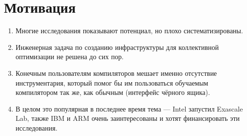 \section{Мотивация}
\begin{enumerate}
\item Многие исследования показывают потенциал, но плохо систематизированы.
\item Инженерная задача по созданию инфраструктуры для коллективной оптимизации не решена до сих пор.
\item Конечным пользователям компиляторов мешает именно отсутствие инструментария, который помог бы им пользоваться обучаемым компилятором так же, как обычным (интерфейс чёрного ящика).
\item В целом это популярная в последнее время тема --- Intel запустил Exascale Lab, также IBM и ARM очень заинтересованы и хотят финансировать эти исследования.
\end{enumerate}
